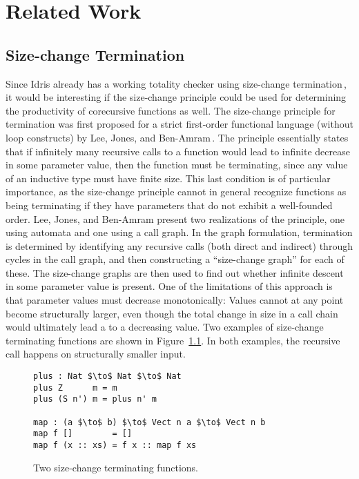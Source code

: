 \chapter{Related Work}
\label{cha:related-work}

\section{Size-change Termination}
Since Idris already has a working totality checker using size-change termination\,\citep{BradyIdrisImpl13}, it would be interesting if the size-change principle could be used for determining the productivity of corecursive functions as well. The size-change principle for termination was first proposed for a strict first-order functional language (without loop constructs) by Lee, Jones, and Ben-Amram\,\citep{LeeJones01SizeChange}. The principle essentially states that if infinitely many recursive calls to a function would lead to infinite decrease in some parameter value, then the function must be terminating, since any value of an inductive type must have finite size. This last condition is of particular importance, as the size-change principle cannot in general recognize functions as being terminating if they have parameters that do not exhibit a well-founded order. Lee, Jones, and Ben-Amram present two realizations of the principle, one using automata and one using a call graph. In the graph formulation, termination is determined by identifying any recursive calls (both direct and indirect) through cycles in the call graph, and then constructing a ``size-change graph'' for each of these. The size-change graphs are then used to find out whether infinite descent in some parameter value is present. One of the limitations of this approach is that parameter values must decrease monotonically: Values cannot at any point become structurally larger, even though the total change in size in a call chain would ultimately lead a to a decreasing value. Two examples of size-change terminating functions are shown in Figure~\ref{fig:sizechange_plus_map}. In both examples, the recursive call happens on structurally smaller input.

\begin{figure}
\begin{lstlisting}[mathescape]
plus : Nat $\to$ Nat $\to$ Nat
plus Z      m = m
plus (S n') m = plus n' m

map : (a $\to$ b) $\to$ Vect n a $\to$ Vect n b
map f []        = []
map f (x :: xs) = f x :: map f xs
\end{lstlisting}
\caption{Two size-change terminating functions.}
\label{fig:sizechange_plus_map}
\end{figure}

